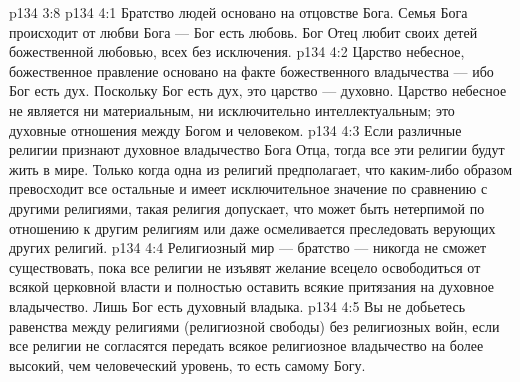 \vs p134 3:8 
\vs p134 4:1 Братство людей основано на отцовстве Бога. Семья Бога происходит от любви Бога --- Бог есть любовь. Бог Отец любит своих детей божественной любовью, всех без исключения.
\vs p134 4:2 Царство небесное, божественное правление основано на факте божественного владычества --- ибо Бог есть дух. Поскольку Бог есть дух, это царство --- духовно. Царство небесное не является ни материальным, ни исключительно интеллектуальным; это духовные отношения между Богом и человеком.
\vs p134 4:3 Если различные религии признают духовное владычество Бога Отца, тогда все эти религии будут жить в мире. Только когда одна из религий предполагает, что каким\hyp{}либо образом превосходит все остальные и имеет исключительное значение по сравнению с другими религиями, такая религия допускает, что может быть нетерпимой по отношению к другим религиям или даже осмеливается преследовать верующих других религий.
\vs p134 4:4 Религиозный мир --- братство --- никогда не сможет существовать, пока все религии не изъявят желание всецело освободиться от всякой церковной власти и полностью оставить всякие притязания на духовное владычество. Лишь Бог есть духовный владыка.
\vs p134 4:5 Вы не добьетесь равенства между религиями (религиозной свободы) без религиозных войн, если все религии не согласятся передать всякое религиозное владычество на более высокий, чем человеческий уровень, то есть самому Богу.
